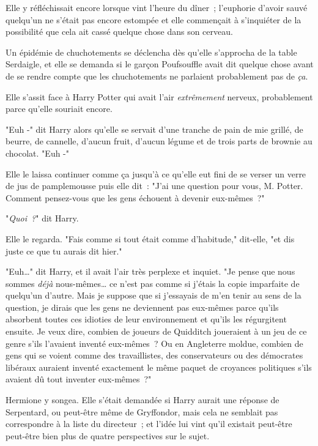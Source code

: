 \later

Elle y réfléchissait encore lorsque vint l'heure du dîner~; l'euphorie d'avoir sauvé quelqu'un ne s'était pas encore estompée et elle commençait à s'inquiéter de la possibilité que cela ait cassé quelque chose dans son cerveau.

Un épidémie de chuchotements se déclencha dès qu'elle s'approcha de la table Serdaigle, et elle se demanda si le garçon Poufsouffle avait dit quelque chose avant de se rendre compte que les chuchotements ne parlaient probablement pas de \emph{ça}.

Elle s'assit face à Harry Potter qui avait l'air \emph{extrêmement} nerveux, probablement parce qu'elle souriait encore.

"Euh -" dit Harry alors qu'elle se servait d'une tranche de pain de mie grillé, de beurre, de cannelle, d'aucun fruit, d'aucun légume et de trois parts de brownie au chocolat. "Euh -"

Elle le laissa continuer comme ça jusqu'à ce qu'elle eut fini de se verser un verre de jus de pamplemousse puis elle dit~: "J'ai une question pour vous, M. Potter. Comment pensez-vous que les gens échouent à devenir eux-mêmes~?"

"\emph{Quoi~?}" dit Harry.

Elle le regarda. "Fais comme si tout était comme d'habitude," dit-elle, "et dis juste ce que tu aurais dit hier."

"Euh…" dit Harry, et il avait l'air très perplexe et inquiet. "Je pense que nous sommes \emph{déjà} nous-mêmes… ce n'est pas comme si j'étais la copie imparfaite de quelqu'un d'autre. Mais je suppose que si j'essayais de m'en tenir au sens de la question, je dirais que les gens ne deviennent pas eux-mêmes parce qu'ils absorbent toutes ces idioties de leur environnement et qu'ils les régurgitent ensuite. Je veux dire, combien de joueurs de Quidditch joueraient à un jeu de ce genre s'ils l'avaient inventé eux-mêmes~? Ou en Angleterre moldue, combien de gens qui se voient comme des travaillistes, des conservateurs ou des démocrates libéraux auraient inventé exactement le même paquet de croyances politiques s'ils avaient dû tout inventer eux-mêmes~?"

Hermione y songea. Elle s'était demandée si Harry aurait une réponse de Serpentard, ou peut-être même de Gryffondor, mais cela ne semblait pas correspondre à la liste du directeur~; et l'idée lui vint qu'il existait peut-être peut-être bien plus de quatre perspectives sur le sujet.

